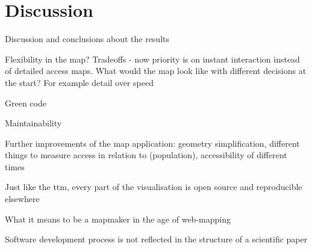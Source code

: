 \section{Discussion}

Discussion and conclusions about the results

Flexibility in the map? Tradeoffs - now priority is on instant interaction instead of detailed access maps.
What would the map look like with different decisions at the start? For example detail over speed

Green code

Maintainability

Further improvements of the map application:
geometry simplification,
different things to measure access in relation to (population),
accessibility of different times

Just like the \acrshort{ttm}, every part of the visualisation is open source and reproducible elsewhere

What it means to be a mapmaker in the age of web-mapping

Software development process is not reflected in the structure of a scientific paper
